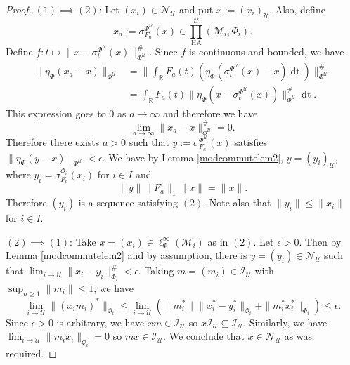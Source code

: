 \documentclass[10pt,a4paper]{amsart}
\def \HA{\operatorname{HA}}
\def \bbR{\mathbb{R}}
\def\cal{\mathcal}
\newcommand\cU{{\cal U}}
\begin{document}
\begin{proof}
    $(1) \implies (2)$: Let $(x_i) \in \cal N_\cU$ and put $x := (x_i)_\cU$.  Also, define
    \[
        x_a := \sigma^{\Phi^{\cU}}_{F_a} (x) \in \prod_{\HA}^{\cU} (\cal M_i,\Phi_i).
    \]    
    Define $f : t \mapsto \|x-\sigma^{\Phi^{\cU}}_t(x) \|^\#_{\Phi^\cU}$.  Since $f$ is continuous and bounded, we have
    \begin{align}
        \| \eta_{\Phi}(x_a - x) \|_{\Phi^{\cU}} &= \| \int_{\bbR} F_a(t) (\eta_{\Phi}(\sigma^{\Phi^{\cU}}_t (x) - x) \operatorname{dt}) \|_{\Phi^\cU}^\# \nonumber \\
        &= \int_{\bbR} F_a(t) \|\eta_{\Phi}(x - \sigma^{\Phi^{\cU}}_t(x)) \|_{\Phi^\cU}^\# \operatorname{dt}.  \nonumber
    \end{align}
    This expression goes to $0$ as $a \to \infty$ and therefore we have
    \[
    \lim_{a\to \infty} \| x_a-x \|^\#_{\Phi^{\cU}} = 0.
    \]
    Therefore there exists $a > 0$ such that $y := \sigma^{\Phi^{\cU}}_{F_a} (x)$ satisfies $\|\eta_{\Phi}(y - x)\|_{\Phi^{\cU}} < \epsilon$.  We have by Lemma \ref{modcommutelem2}, $y = (y_i)_\cU$, where $y_i = \sigma^{\Phi_i}_{F_a} (x_i)$ for $i \in I$ and
    \[
    \| y \| \|F_a\|_1 \|x\| = \|x\|.
    \]
    Therefore $(y_i)$ is a sequence satisfying $(2)$.  Note also that $\|y_i\| \leq \|x_i\|$ for $i \in I$.

    $(2) \implies (1)$: Take $x = (x_i) \in \ell_{\Phi}^\infty (\cal M_i)$ as in $(2)$.  Let $\epsilon > 0$.  Then by Lemma \ref{modcommutelem2} and by assumption, there is $y = (y_i) \in \cal N_\cU$ such that $\lim_{i \to \cU} \| x_i - y_i \|^\#_{\Phi_i} < \epsilon$.  Taking $m = (m_i) \in \cal I_\cU$ with $\sup_{n \geq 1} \|m_i\| \leq 1$, we have
    \[
    \lim_{i \to\cU} \|(x_i m_i)^*\|_{\Phi_i} \leq \lim_{i \to\cU} ( \|m^*_i\| \|x^*_i - y^*_i\|_{\Phi_i} + \|m^*_ix_i^*\|_{\Phi_i}) \leq \epsilon.
    \]
    Since $\epsilon > 0$ is arbitrary, we have $xm \in \cal I_{\cU}$ so $x \cal I_{\cU} \subseteq \cal I_{\cU}$.  Similarly, we have $\lim_{i \to \cU} \| m_i x_i \|_{\Phi_i} = 0$ so $mx \in \cal I_{\cU}$.  We conclude that $x \in \cal N_\cU$ as was required.
\end{proof}
\end{document}
